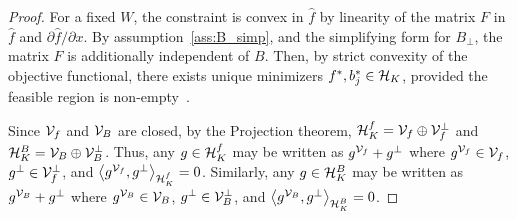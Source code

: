 \begin{proof}
For a fixed $W$, the constraint is convex in $\hat{f}$ by linearity of the matrix $F$ in $\hat{f}$ and $\partial \hat{f}/\partial x$. By assumption~\eqref{ass:B_simp}, and the simplifying form for $B_{\perp}$, the matrix $F$ is additionally independent of $B$. Then, by strict convexity of the objective functional, there exists unique minimizers $f^*, b_j^* \in \mathcal{H}_{K}$, provided the feasible region is non-empty~\cite{KurdilaZabarankin2006}. 

Since $\mathcal{V}_{f}$ and $\mathcal{V}_{B}$ are closed, by the Projection theorem, $\mathcal{H}_{K}^f = \mathcal{V}_{f} \oplus \mathcal{V}_{f}^{\perp}$ and $\mathcal{H}_K^B = \mathcal{V}_{B} \oplus \mathcal{V}_{B}^{\perp}$. Thus, any $g \in \mathcal{H}_{K}^f$ may be written as $g^{\mathcal{V}_{f}} + g^{\perp}$ where $g^{\mathcal{V}_{f}} \in \mathcal{V}_{f}$, $g^{\perp} \in \mathcal{V}_{f}^\perp$, and $\left\langle g^{\mathcal{V}_{f}}, g^{\perp} \right\rangle_{\mathcal{H}_{K}^f} = 0$. Similarly, any $g \in \mathcal{H}_K^B$ may be written as $g^{\mathcal{V}_{B}} + g^{\perp}$ where $g^{\mathcal{V}_{B}} \in \mathcal{V}_{B}$, $g^{\perp} \in \mathcal{V}_{B}^\perp$, and $\left\langle g^{\mathcal{V}_{B}}, g^{\perp} \right\rangle_{\mathcal{H}_K^B} = 0$.


\end{proof}
